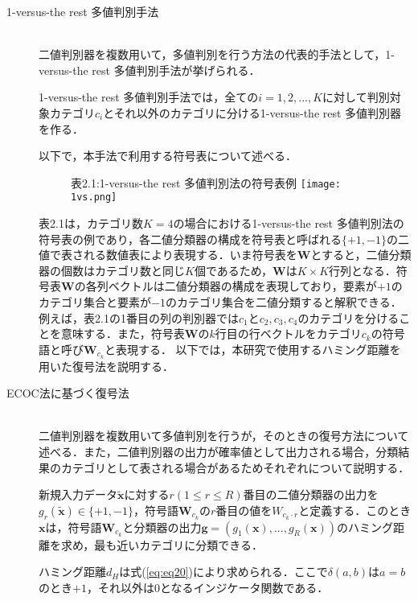 \begin{description}
\item[1-versus-the rest 多値判別手法]\mbox{}\\ 
\;\;\;二値判別器を複数用いて，多値判別を行う方法の代表的手法\cite{Code}として，1-versus-the rest 多値判別手法が挙げられる．\par
1-versus-the rest 多値判別手法では，全ての$i = 1,2,...,K$に対して判別対象カテゴリ$c_i$とそれ以外のカテゴリに分ける1-versus-the rest 多値判別器を作る．\par
以下で，本手法で利用する符号表について述べる．

\begin{figure}[H]
\centering
表2.1:1-versus-the rest 多値判別法の符号表例
\texttt{[image: 1vs.png]}
\end{figure}\par
表2.1は，カテゴリ数$K = 4$の場合における1-versus-the rest 多値判別法の符号表の例であり，各二値分類器の構成を符号表と呼ばれる$\{+1,-1\}$の二値で表される数値表により表現する．いま符号表を$\bm{W}$とすると，二値分類器の個数はカテゴリ数と同じ$K$個であるため，$\bm{W}$は$K\times K$行列となる．符号表$\bm{W}$の各列ベクトルは二値分類器の構成を表現しており，要素が$+1$のカテゴリ集合と要素が$-1$のカテゴリ集合を二値分類すると解釈できる．例えば，表2.1の1番目の列の判別器では$c_1$と$c_2,c_3,c_4$のカテゴリを分けることを意味する．また，符号表$\bm{W}$の$k$行目の行ベクトルをカテゴリ$c_k$の符号語と呼び$\bm{W}_{c_k}$と表現する．
以下では，本研究で使用するハミング距離を用いた復号法を説明する．



\item[ECOC法に基づく復号法]\mbox{}\\ 
\;\;\;二値判別器を複数用いて多値判別を行うが，そのときの復号方法について述べる．また，二値判別器の出力が確率値として出力される場合，分類結果のカテゴリとして表される場合があるためそれぞれについて説明する．


新規入力データ$\tilde{\bm{x}}$に対する$r (1\leq r \leq R)$番目の二値分類器の出力を$g_r(\tilde{\bm{x}})\in\{+1,-1\}$，符号語$\bm{W}_{c_k}$の$r$番目の値を$W_{c_k\cdot r}$と定義する．このとき$\bm{x}$は，符号語$\bm{W}_{c_k}$と分類器の出力$\bm{g}=(g_1(\bm{x}),...,g_R(\bm{x}))$のハミング距離を求め，最も近いカテゴリに分類できる．\par
ハミング距離$d_H$は式(\ref{eq:eq20})により求められる．ここで$\delta(a,b)$は$a = b$のとき$+1$，それ以外は$0$となるインジケータ関数である．


\end{description}
